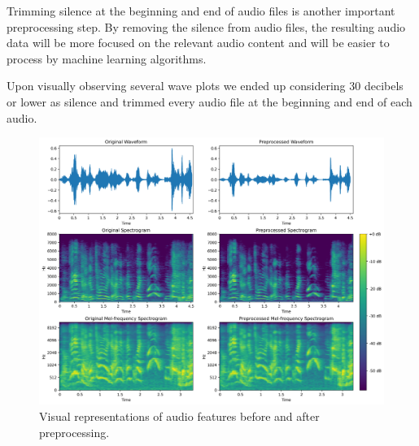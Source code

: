 Trimming silence at the beginning and end of audio files is another important preprocessing step. By removing the silence from audio files, the resulting audio data will be more focused on the relevant audio content and will be easier to process by machine learning algorithms.

Upon visually observing several wave plots we ended up considering 30 decibels or lower as silence and trimmed every audio file at the beginning and end of each audio.


\begin{figure}[H]
	\centering
	\includegraphics[width=\textwidth]{figs/4_2_preprocessing/preprocessing.png}
	\caption{Visual representations of audio features before and after preprocessing.}
	\label{fig:prep}
\end{figure}

